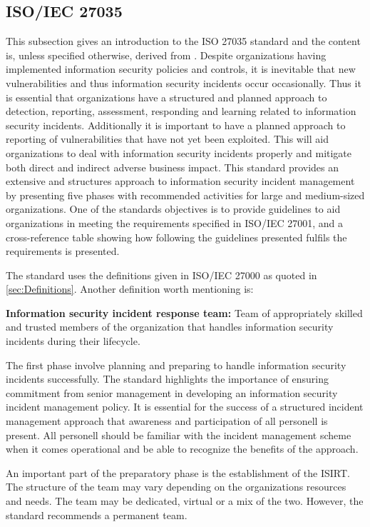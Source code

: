 \subsection{\acs{ISO}/\acs{IEC} 27035}
This subsection gives an introduction to the ISO 27035 standard and the content is, unless specified otherwise, derived from \cite{ISO/IEC27035}. Despite organizations having implemented information security policies and controls, it is inevitable that new vulnerabilities and thus information security incidents occur occasionally. Thus it is essential that organizations have a structured and planned approach to detection, reporting, assessment, responding and learning related to information security incidents. Additionally it is important to have a planned approach to reporting of vulnerabilities that have not yet been exploited. This will aid organizations to deal with information security incidents properly and mitigate both direct and indirect adverse business impact. This standard provides an extensive and structures approach to information security incident management by presenting five phases with recommended activities for large and medium-sized organizations. One of the standards objectives is to provide guidelines to aid organizations in meeting the requirements specified in ISO/IEC 27001, and a cross-reference table showing how following the guidelines presented fulfils the requirements is presented.

The standard uses the definitions given in ISO/IEC 27000 as quoted in \ref{sec:Definitions}. Another definition worth mentioning is:

\textbf{Information security incident response team:} Team of appropriately skilled and trusted members of the organization that handles information security incidents during their lifecycle.

The first phase involve planning and preparing to handle information security incidents successfully. The standard highlights the importance of ensuring commitment from senior management in developing an information security incident management policy. It is essential for the success of a structured incident management approach that awareness and participation of all personell is present. All personell should be familiar with the incident management scheme when it comes operational and be able to recognize the benefits of the approach. 

An important part of the preparatory phase is the establishment of the ISIRT. The structure of the team may vary depending on the organizations resources and needs. The team may be dedicated, virtual or a mix of the two. However, the standard recommends a permanent team. 

